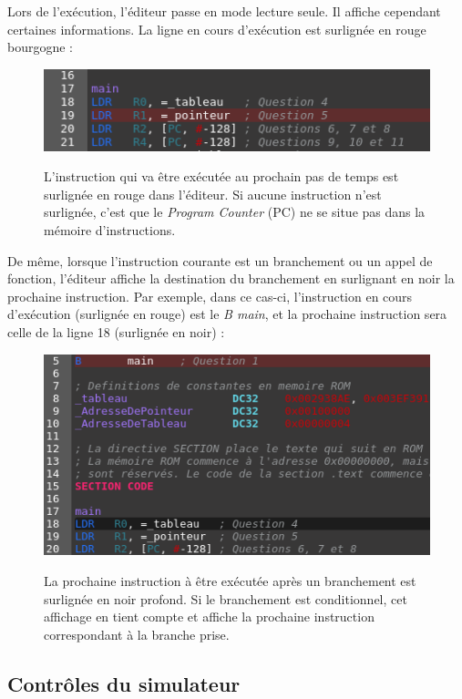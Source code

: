 \documentclass{tufte-handout}
\begin{document}
Lors de l'exécution, l'éditeur passe en mode lecture seule. Il affiche cependant certaines informations. La ligne en cours d'exécution est surlignée en rouge bourgogne :
\begin{figure}[h!]
\raggedleft
\includegraphics[width=0.9\linewidth]{pics/editeur_lignecourante.png}
\label{f:editeurlignecourante}
\caption{L'instruction qui va être exécutée au prochain pas de temps est surlignée en rouge dans l'éditeur. Si aucune instruction n'est surlignée, c'est que le \textit{Program Counter} (PC) ne se situe pas dans la mémoire d'instructions.}
\end{figure}

De même, lorsque l'instruction courante est un branchement ou un appel de fonction, l'éditeur affiche la destination du branchement en surlignant en noir la prochaine instruction. Par exemple, dans ce cas-ci, l'instruction en cours d'exécution (surlignée en rouge) est le \textit{B main}, et la prochaine instruction sera celle de la ligne 18 (surlignée en noir) :
\begin{figure}[h!]
\raggedleft
\includegraphics[width=0.9\linewidth]{pics/editeur_prediction.png}
\label{f:editeurbranch}
\caption{La prochaine instruction à être exécutée après un branchement est surlignée en noir profond. Si le branchement est conditionnel, cet affichage en tient compte et affiche la prochaine instruction correspondant à la branche prise.}
\end{figure}

\clearpage

\subsection{Contrôles du simulateur}
\end{document}
